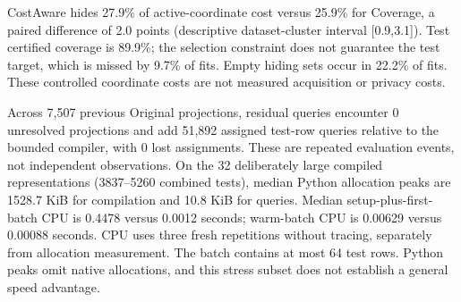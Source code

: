 CostAware hides 27.9\% of active-coordinate cost versus 25.9\% for Coverage, a paired difference of 2.0 points (descriptive dataset-cluster interval [0.9,3.1]). Test certified coverage is 89.9\%; the selection constraint does not guarantee the test target, which is missed by 9.7\% of fits. Empty hiding sets occur in 22.2\% of fits. These controlled coordinate costs are not measured acquisition or privacy costs.

Across 7,507 previous Original projections, residual queries encounter 0 unresolved projections and add 51,892 assigned test-row queries relative to the bounded compiler, with 0 lost assignments. These are repeated evaluation events, not independent observations. On the 32 deliberately large compiled representations (3837--5260 combined tests), median Python allocation peaks are 1528.7 KiB for compilation and 10.8 KiB for queries. Median setup-plus-first-batch CPU is 0.4478 versus 0.0012 seconds; warm-batch CPU is 0.00629 versus 0.00088 seconds. CPU uses three fresh repetitions without tracing, separately from allocation measurement. The batch contains at most 64 test rows. Python peaks omit native allocations, and this stress subset does not establish a general speed advantage.

